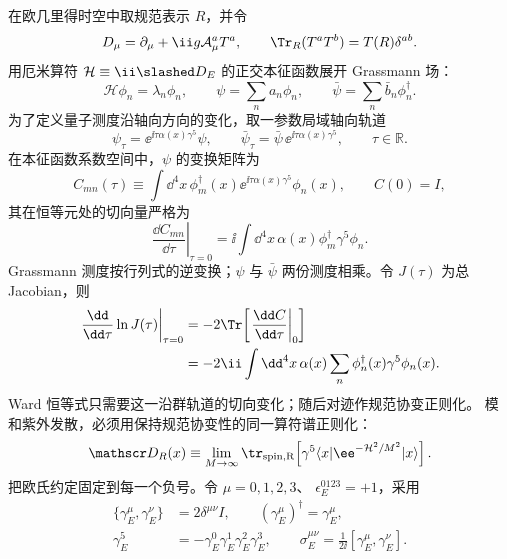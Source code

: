\begin{derivation}[轴向变换中的费米子测度与反常]
在欧几里得时空中取规范表示 $R$，并令
\begin{equation*}
 D_\mu=\partial_\mu+\ii g\mathcal A_\mu^aT^a,
 \qquad
 \Tr_R(T^aT^b)=T(R)\delta^{ab}.
\end{equation*}
用厄米算符 $\mathcal H\equiv\ii\slashed D_E$ 的正交本征函数展开 Grassmann 场：
\begin{equation*}
 \mathcal H\phi_n=\lambda_n\phi_n,
 \qquad
 \psi=\sum_na_n\phi_n,
 \qquad
 \bar\psi=\sum_n\bar b_n\phi_n^\dagger.
\end{equation*}
为了定义量子测度沿轴向方向的变化，取一参数局域轴向轨道
\begin{equation*}
 \psi_\tau=\ee^{\ii\tau\alpha(x)\gamma^5}\psi,
 \qquad
 \bar\psi_\tau=\bar\psi\,\ee^{\ii\tau\alpha(x)\gamma^5},
 \qquad \tau\in\mathbb R.
\end{equation*}
在本征函数系数空间中，$\psi$ 的变换矩阵为
\begin{equation*}
 C_{mn}(\tau)
 \equiv\int\dd^4x\,
 \phi_m^\dagger(x)\ee^{\ii\tau\alpha(x)\gamma^5}\phi_n(x),
 \qquad C(0)=I,
\end{equation*}
其在恒等元处的切向量严格为
\begin{equation*}
 \left.\frac{\dd C_{mn}}{\dd\tau}\right|_{\tau=0}
 =\ii\int\dd^4x\,
 \alpha(x)\phi_m^\dagger\gamma^5\phi_n.
\end{equation*}
Grassmann 测度按行列式的逆变换；$\psi$ 与 $\bar\psi$ 两份测度相乘。令 $J(\tau)$ 为总 Jacobian，则
\begin{align*}
 \left.\frac{\dd}{\dd\tau}\ln J(\tau)\right|_{\tau=0}
 &=-2\Tr\!\left[\left.\frac{\dd C}{\dd\tau}\right|_{0}\right]\\
 &=-2\ii\int\dd^4x\,\alpha(x)
 \sum_n\phi_n^\dagger(x)\gamma^5\phi_n(x).
\end{align*}
Ward 恒等式只需要这一沿群轨道的切向变化；随后对迹作规范协变正则化。
模和紫外发散，必须用保持规范协变性的同一算符谱正则化：
\begin{equation*}
 \mathscr D_R(x)
 \equiv\lim_{M\to\infty}
 \tr_{\rm spin,R}\!\left[
 \gamma^5\langle x|\ee^{-\mathcal H^2/M^2}|x\rangle
 \right].
\end{equation*}
把欧氏约定固定到每一个负号。令 $\mu=0,1,2,3$、
$\epsilon_E^{0123}=+1$，采用
\begin{align*}
\{\gamma_E^\mu,\gamma_E^\nu\}&=2\delta^{\mu\nu}I,\qquad
(\gamma_E^\mu)^\dagger=\gamma_E^\mu,\\
\gamma_E^5&=-\gamma_E^0\gamma_E^1\gamma_E^2\gamma_E^3,\qquad
\sigma_E^{\mu\nu}=\frac1{2\ii}[\gamma_E^\mu,\gamma_E^\nu].

\end{align*}
\end{derivation}
